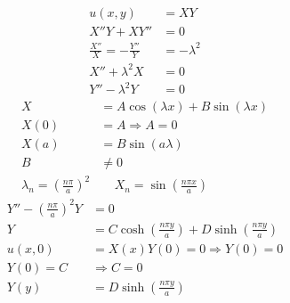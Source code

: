\documentclass[../../HW07.tex]{subfiles}
\begin{document}
\begin{align*}
    u(x,y)                         & = XY           \\
    X''Y + XY''                    & = 0            \\
    \frac{X''}{X} = -\frac{Y''}{Y} & = -\lambda^{2} \\
    X'' + \lambda^{2}X             & = 0            \\
    Y'' - \lambda^{2}Y             & = 0
\end{align*}
\begin{align*}
    X                                               & = A\cos(\lambda x) + B\sin(\lambda x)             \\
    X(0)                                            & = A \Rightarrow A = 0                             \\
    X(a)                                            & = B\sin(a\lambda)                                 \\
    B                                               & \ne 0                                             \\
    \lambda_{n} = \left( \frac{n\pi}{a} \right)^{2} & \,\quad X_{n}=\sin\left( \frac{n\pi x}{a} \right)
\end{align*}
\begin{align*}
    Y''-\left( \frac{n\pi}{a} \right)^{2}Y & = 0                                                                             \\
    Y                                      & = C\cosh\left( \frac{n\pi y}{a} \right) + D\sinh\left( \frac{n\pi y}{a} \right) \\
    u(x,0)                                 & = X(x)Y(0) = 0 \Rightarrow Y(0) = 0                                             \\
    Y(0)=C                                 & \Rightarrow C = 0                                                               \\
    Y(y)                                   & = D\sinh\left( \frac{n\pi y}{a} \right)
\end{align*}
\end{document}
